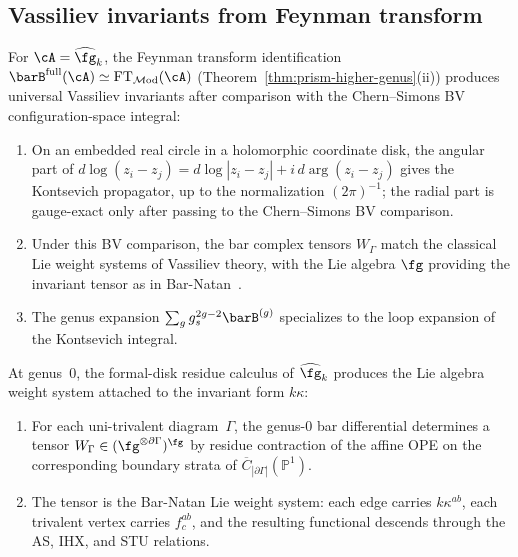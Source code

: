 \subsection{Vassiliev invariants from Feynman transform}
\label{subsec:vassiliev}

\begin{conjecture}\label{conj:v1-vassiliev-bar}
For $\cA = \widehat{\fg}_k$, the Feynman transform identification
$\barB^{\mathrm{full}}(\cA) \simeq \mathrm{FT}_{\mathcal{M}\mathrm{od}}(\cA)$
\textup{(}Theorem~\textup{\ref{thm:prism-higher-genus}(ii))}
produces universal Vassiliev invariants after comparison with the
Chern--Simons BV configuration-space integral:
\begin{enumerate}[label=\textup{(\roman*)}]
\item On an embedded real circle in a holomorphic coordinate disk,
 the angular part of
 $d\log(z_i-z_j)=d\log|z_i-z_j|+i\,d\arg(z_i-z_j)$ gives the
 Kontsevich propagator, up to the normalization
 $(2\pi)^{-1}$; the radial part is gauge-exact only after passing to
 the Chern--Simons BV comparison.
\item Under this BV comparison, the bar complex tensors
 $W_\Gamma$ match the classical Lie weight systems of Vassiliev
 theory, with the Lie algebra $\fg$ providing the invariant tensor as
 in Bar-Natan~\cite{BarNatan95}.
\item The genus expansion
 $\sum_g g_s^{2g-2} \barB^{(g)}$ specializes to the
 loop expansion of the Kontsevich integral.
\end{enumerate}
\end{conjecture}

\begin{proposition}\label{prop:vassiliev-genus0}
At genus~$0$, the formal-disk residue calculus of
$\widehat{\fg}_k$ produces the Lie algebra weight system attached to
the invariant form $k\kappa$:
\begin{enumerate}[label=\textup{(\roman*)}]
\item For each uni-trivalent diagram~$\Gamma$, the genus-$0$ bar
 differential determines a tensor
 $W_\Gamma \in (\fg^{\otimes \partial\Gamma})^\fg$ by residue
 contraction of the affine OPE on the corresponding boundary strata
 of $\overline{C}_{|\partial\Gamma|}(\mathbb{P}^1)$.
\item The tensor is the Bar-Natan Lie weight system:
 each edge carries $k\kappa^{ab}$, each trivalent vertex carries
 $f^{ab}_{c}$, and the resulting functional descends through the
 AS, IHX, and STU relations.
\end{enumerate}
\end{proposition}

